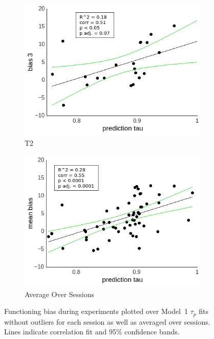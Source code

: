 \documentclass[a4paper]{scrreprt}
\begin{document}
\begin{figure}
\begin{subfigure}[b]{0.49\textwidth}
        \includegraphics[width=\textwidth]{figs/sec3/pred/predno_diff_3_mod1dat.jpeg}
        \caption{T2}
    \end{subfigure}
    \begin{subfigure}[b]{0.49\textwidth}
        \includegraphics[width=\textwidth]{figs/sec3/pred/predno_diff_mean_mod1dat.jpeg}
        \caption{Average Over Sessions}
    \end{subfigure}
\caption{Functioning bias during experiments plotted over Model~1 $\tau_p$ fits without outliers for each session as well as averaged over sessions. Lines indicate correlation fit and 95\% confidence bands.}
\label{fig:predno_diff_mod1dat}
\end{figure}
\end{document}
